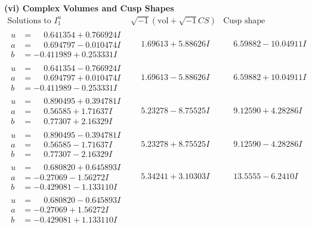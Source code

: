 \documentclass[1p]{elsarticle_modified}
\theoremstyle{definition}
\newcommand{\I}{\sqrt{-1}}
\begin{document}
\newpage\flushleft \textbf{(vi) Complex Volumes and Cusp Shapes}
$$\begin{array}{c|c|c}  
\text{Solutions to }I^u_{1}& \I (\text{vol} + \sqrt{-1}CS) & \text{Cusp shape}\\
 \hline 
\begin{aligned}
u &= \phantom{-}0.641354 + 0.766924 I \\
a &= \phantom{-}0.694797 - 0.010474 I \\
b &= -0.411989 + 0.253331 I\end{aligned}
 & \phantom{-}1.69613 + 5.88626 I & \phantom{-}6.59882 - 10.04911 I \\ \hline\begin{aligned}
u &= \phantom{-}0.641354 - 0.766924 I \\
a &= \phantom{-}0.694797 + 0.010474 I \\
b &= -0.411989 - 0.253331 I\end{aligned}
 & \phantom{-}1.69613 - 5.88626 I & \phantom{-}6.59882 + 10.04911 I \\ \hline\begin{aligned}
u &= \phantom{-}0.890495 + 0.394781 I \\
a &= \phantom{-}0.56585 + 1.71637 I \\
b &= \phantom{-}0.77307 + 2.16329 I\end{aligned}
 & \phantom{-}5.23278 - 8.75525 I & \phantom{-}9.12590 + 4.28286 I \\ \hline\begin{aligned}
u &= \phantom{-}0.890495 - 0.394781 I \\
a &= \phantom{-}0.56585 - 1.71637 I \\
b &= \phantom{-}0.77307 - 2.16329 I\end{aligned}
 & \phantom{-}5.23278 + 8.75525 I & \phantom{-}9.12590 - 4.28286 I \\ \hline\begin{aligned}
u &= \phantom{-}0.680820 + 0.645893 I \\
a &= -0.27069 - 1.56272 I \\
b &= -0.429081 - 1.133110 I\end{aligned}
 & \phantom{-}5.34241 + 3.10303 I & \phantom{-}13.5555 - 6.2410 I \\ \hline\begin{aligned}
u &= \phantom{-}0.680820 - 0.645893 I \\
a &= -0.27069 + 1.56272 I \\
b &= -0.429081 + 1.133110 I\end{aligned}

\end{array}$$
\end{document}
